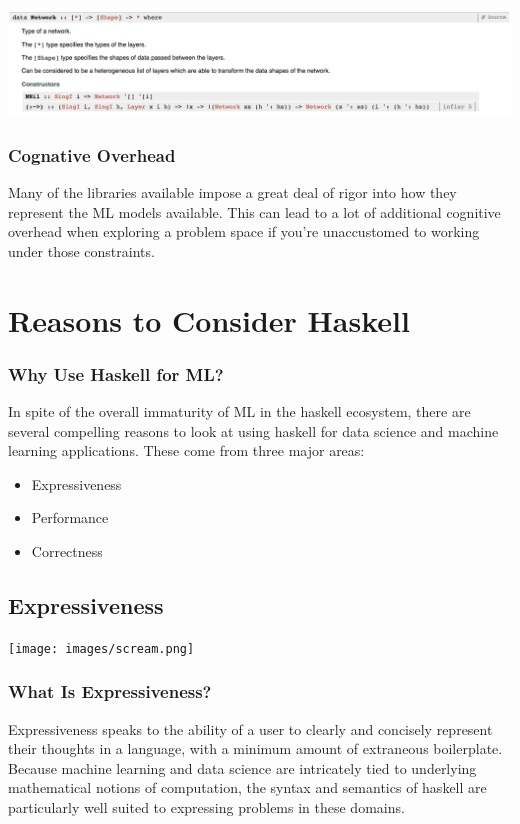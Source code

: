 \documentclass{beamer}
\begin{document}
\begin{frame}[fragile]
  \begin{center}
    \includegraphics[width=.85\paperwidth]{images/typesig.png}
  \end{center}
\end{frame}

\begin{frame}
  \frametitle{Cognative Overhead}
  Many of the libraries available impose a great deal of rigor into
  how they represent the ML models available.  This can lead to a lot
  of additional cognitive overhead when exploring a problem space if
  you're unaccustomed to working under those constraints.
\end{frame}

\section{Reasons to Consider Haskell}

\begin{frame}
  \frametitle{Why Use Haskell for ML?}
  In spite of the overall immaturity of ML in the haskell ecosystem, there are several compelling reasons to look at using haskell for data science and machine learning applications.  These come from three major areas:
  \begin{itemize}
    \item Expressiveness
    \item Performance
    \item Correctness
  \end{itemize}
\end{frame}

\subsection{Expressiveness}

\begin{frame}[fragile]
  \begin{center}
    \texttt{[image: images/scream.png]}
  \end{center}
\end{frame}

\begin{frame}
  \frametitle{What Is Expressiveness?}
  Expressiveness speaks to the ability of a user to clearly and
  concisely represent their thoughts in a language, with a minimum
  amount of extraneous boilerplate.  Because machine learning and data
  science are intricately tied to underlying mathematical notions of
  computation, the syntax and semantics of haskell are particularly
  well suited to expressing problems in these domains.
\end{frame}
\end{document}

